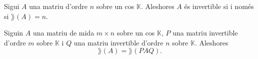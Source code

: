 \documentclass[../../Main.tex]{subfiles}
\begin{document}
	\begin{corollary}
		Sigui \(A\) una matriu d'ordre \(n\) sobre un cos \(\mathbb{K}\). Aleshores \(A\) és invertible si i només si \(\rang(A)=n\).
	\end{corollary}
	\begin{observation}
		\label{obs:rang d'una matriu és invariant pel producte amb invertibles}
		Siguin \(A\) una matriu de mida \(m\times n\) sobre un cos \(\mathbb{K}\), \(P\) una matriu invertible d'ordre \(m\) sobre \(\mathbb{K}\) i \(Q\) una matriu invertible d'ordre \(n\) sobre \(\mathbb{K}\). Aleshores
		\[
		    \rang(A)=\rang(PAQ).
		\]
	\end{observation}
%		
\end{document}
